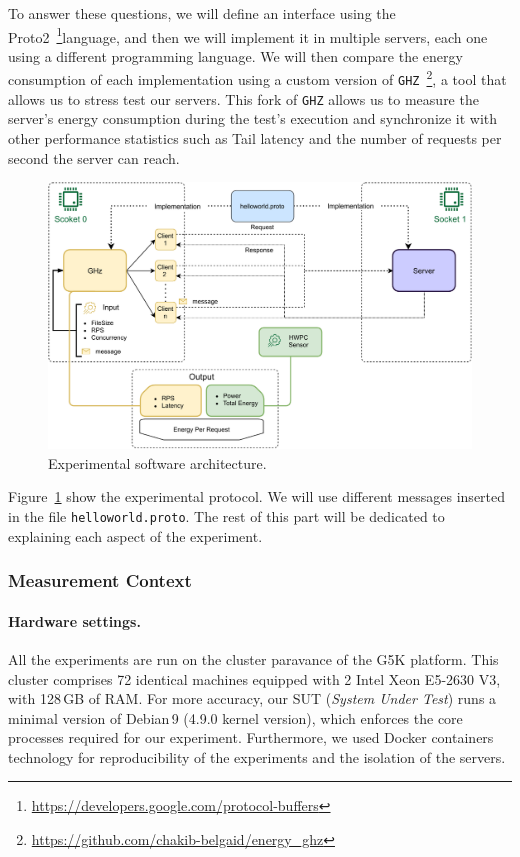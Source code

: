 To answer these questions, we will define an interface using the Proto2~\footnote{\url{https://developers.google.com/protocol-buffers}}language, and then we will implement it in multiple servers, each one using a different programming language.
We will then compare the energy consumption of each implementation using a custom version of \texttt{GHZ}~\footnote{\url{https://github.com/chakib-belgaid/energy_ghz}}, a tool that allows us to stress test our servers. This fork of \texttt{GHZ} allows us to measure the server's energy consumption during the test's execution and synchronize it with other performance statistics such as Tail latency and the number of requests per second the server can reach.
\begin{figure}[!hbt]
    \begin{center}
        \includegraphics[width=.8\linewidth]{imgs/rpcprotocol}
    \end{center}
    \caption{Experimental software architecture.}\label{fig:rpcprotocol}
\end{figure}
Figure~\ref{fig:rpcprotocol} show the experimental protocol. We will use different messages inserted in the file \texttt{helloworld.proto}.
The rest of this part will be dedicated to explaining each aspect of the experiment.
\subsubsection{Measurement Context}
\paragraph{Hardware settings.}
All the experiments are run on the cluster \textsf{paravance} of the G5K platform.
This cluster comprises 72 identical machines equipped with 2 Intel Xeon E5-2630 V3, with 128\,GB of RAM.
For more accuracy, our SUT (\emph{System Under Test}) runs a minimal version of Debian\,9 (4.9.0 kernel version), which enforces the core processes required for our experiment.
Furthermore, we used Docker containers technology for reproducibility of the experiments and the isolation of the servers.
